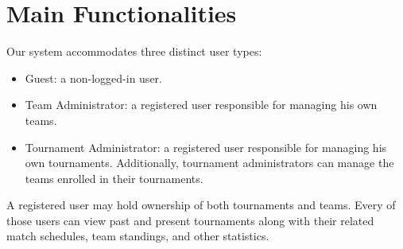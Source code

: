 \section{Main Functionalities}

\noindent Our system accommodates three distinct user types:
\begin{itemize}
    \item Guest: a non-logged-in user.
    \item Team Administrator: a registered user responsible for managing his own teams.
    \item Tournament Administrator: a registered user responsible for managing his own tournaments.
    Additionally, tournament administrators can manage the teams enrolled in their tournaments.
\end{itemize}
A registered user may hold ownership of both tournaments and teams.
Every of those users can view past and present tournaments along with their related match schedules,
team standings, and other statistics.\\


